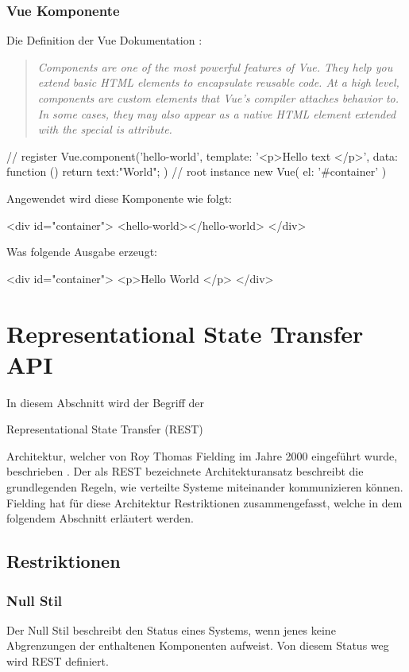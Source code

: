 \subsubsection{Vue Komponente}
Die Definition der Vue Dokumentation \cite{vue-component}: 
\begin{quote}
	\begin{english}
		\textit{Components are one of the most powerful features of Vue. They help you extend basic HTML elements to encapsulate reusable code. At a high level, components are custom elements that Vue’s compiler attaches behavior to. In some cases, they may also appear as a native HTML element extended with the special is attribute.}
	\end{english}
\end{quote}

\begin{JsCode}
	// register
	Vue.component('hello-world', {
		template: '<p>Hello {{ text }} </p>',
		data: function () {
			return {text:"World"};
		}
	})
	// root instance
	new Vue({
		el: '#container'
	})
\end{JsCode}

Angewendet wird diese Komponente wie folgt:
\begin{JsCode}[numbers=none]
	<div id="container">
	<hello-world></hello-world>
	</div>
\end{JsCode}
Was folgende Ausgabe erzeugt:
\begin{JsCode}[numbers=none]
	<div id="container">
	<p>Hello World </p>
	</div>
\end{JsCode}

\section{Representational State Transfer  API}
In diesem Abschnitt wird der Begriff der \begin{english}
Representational State Transfer (REST)
\end{english} Architektur, welcher von Roy Thomas Fielding im Jahre 2000 eingeführt wurde, beschrieben \cite{rest}.
Der als REST bezeichnete Architekturansatz beschreibt die grundlegenden Regeln, wie verteilte Systeme miteinander kommunizieren können.
Fielding hat für diese Architektur Restriktionen zusammengefasst, welche in dem folgendem Abschnitt erläutert werden.
\subsection{Restriktionen}
\subsubsection{Null Stil}
Der Null Stil beschreibt den Status eines Systems, wenn jenes keine Abgrenzungen der enthaltenen Komponenten aufweist. Von diesem Status weg wird REST definiert. 
